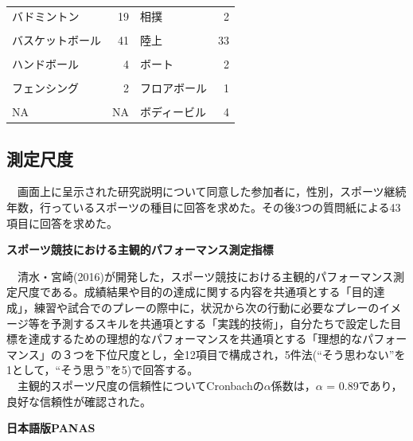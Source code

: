 \documentclass[12pt,a4paper,xelatex,ja=standard]{bxjsarticle}
\begin{document}
\begin{table}[!h]
\begin{tabular}[t]{lrlr}
バドミントン & 19 & 相撲 & 2\\
\cellcolor[HTML]{F5F5F5}{トライアスロン} & \cellcolor[HTML]{F5F5F5}{2} & \cellcolor[HTML]{F5F5F5}{空手} & \cellcolor[HTML]{F5F5F5}{3}\\
バスケットボール & 41 & 陸上 & 33\\
\cellcolor[HTML]{F5F5F5}{バレーボール} & \cellcolor[HTML]{F5F5F5}{17} & \cellcolor[HTML]{F5F5F5}{駅伝} & \cellcolor[HTML]{F5F5F5}{1}\\
ハンドボール & 4 & ボート & 2\\
\addlinespace
\cellcolor[HTML]{F5F5F5}{ビーチバレーボール} & \cellcolor[HTML]{F5F5F5}{1} & \cellcolor[HTML]{F5F5F5}{ボウリング} & \cellcolor[HTML]{F5F5F5}{1}\\
フェンシング & 2 & フロアボール & 1\\
\cellcolor[HTML]{F5F5F5}{フットサル} & \cellcolor[HTML]{F5F5F5}{1} & \cellcolor[HTML]{F5F5F5}{ボクシング} & \cellcolor[HTML]{F5F5F5}{1}\\
NA & NA & ボディービル & 4\\
\bottomrule
\end{tabular}
\end{table}

\clearpage

\hypertarget{ux6e2cux5b9aux5c3aux5ea6}{%
\subsection{測定尺度}\label{ux6e2cux5b9aux5c3aux5ea6}}

　画面上に呈示された研究説明について同意した参加者に，性別，スポーツ継続年数，行っているスポーツの種目に回答を求めた。その後3つの質問紙による43項目に回答を求めた。
　

\textbf{スポーツ競技における主観的パフォーマンス測定指標}

　清水・宮崎(2016)が開発した，スポーツ競技における主観的パフォーマンス測定尺度である。成績結果や目的の達成に関する内容を共通項とする「目的達成」，練習や試合でのプレーの際中に，状況から次の行動に必要なプレーのイメージ等を予測するスキルを共通項とする「実践的技術」，自分たちで設定した目標を達成するための理想的なパフォーマンスを共通項とする「理想的なパフォーマンス」の３つを下位尺度とし，全12項目で構成され，5件法(``そう思わない''を1として，``そう思う''を5)で回答する。\\
　主観的スポーツ尺度の信頼性についてCronbachの\(\alpha\)係数は，\(\alpha\)
= 0.89であり，良好な信頼性が確認された。

\textbf{日本語版PANAS}
\end{document}
